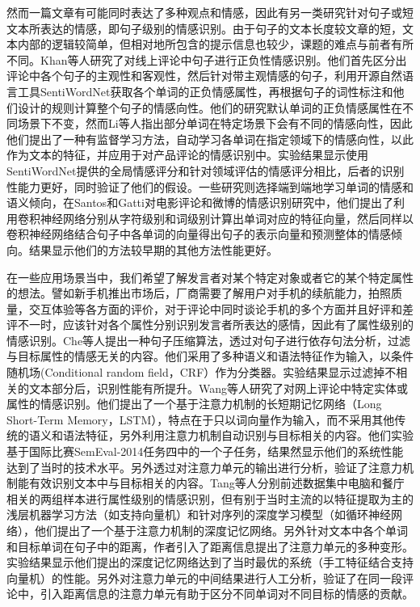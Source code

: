 然而一篇文章有可能同时表达了多种观点和情感，因此有另一类研究针对句子或短文本所表达的情感，即句子级别的情感识别。由于句子的文本长度较文章的短，文本内部的逻辑较简单，但相对地所包含的提示信息也较少，课题的难点与前者有所不同。Khan等人\cite{khan2011sentiment}研究了对线上评论中句子进行正负性情感识别。他们首先区分出评论中各个句子的主观性和客观性，然后针对带主观情感的句子，利用开源自然语言工具SentiWordNet获取各个单词的正负情感属性，再根据句子的词性标注和他们设计的规则计算整个句子的情感向性。他们的研究默认单词的正负情感属性在不同场景下不变，然而Li等人\cite{li2013constructing}指出部分单词在特定场景下会有不同的情感向性，因此他们提出了一种有监督学习方法，自动学习各单词在指定领域下的情感向性，以此作为文本的特征，并应用于对产品评论的情感识别中。实验结果显示使用SentiWordNet提供的全局情感评分和针对领域评估的情感评分相比，后者的识别性能力更好，同时验证了他们的假设。一些研究则选择端到端地学习单词的情感和语义倾向，在Santos和Gatti\cite{dos2014deep}对电影评论和微博的情感识别研究中，他们提出了利用卷积神经网络分别从字符级别和词级别计算出单词对应的特征向量，然后同样以卷积神经网络结合句子中各单词的向量得出句子的表示向量和预测整体的情感倾向。结果显示他们的方法较早期的其他方法性能更好。

在一些应用场景当中，我们希望了解发言者对某个特定对象或者它的某个特定属性的想法。譬如新手机推出市场后，厂商需要了解用户对手机的续航能力，拍照质量，交互体验等各方面的评价，对于评论中同时谈论手机的多个方面并且好评和差评不一时，应该针对各个属性分别识别发言者所表达的感情，因此有了属性级别的情感识别。Che等人\cite{che2015sentence}提出一种句子压缩算法，透过对句子进行依存句法分析，过滤与目标属性的情感无关的内容。他们采用了多种语义和语法特征作为输入，以条件随机场(Conditional random field，CRF）作为分类器。实验结果显示过滤掉不相关的文本部分后，识别性能有所提升。Wang等人\cite{wang2016attention}研究了对网上评论中特定实体或属性的情感识别。他们提出了一个基于注意力机制的长短期记忆网络（Long Short-Term Memory，LSTM），特点在于只以词向量作为输入，而不采用其他传统的语义和语法特征，另外利用注意力机制自动识别与目标相关的内容。他们实验基于国际比赛SemEval-2014任务四\cite{pontiki2014semeval}中的一个子任务，结果然显示他们的系统性能达到了当时的技术水平。另外透过对注意力单元的输出进行分析，验证了注意力机制能有效识别文本中与目标相关的内容。Tang等人\cite{tang2016aspect}分别前述数据集中电脑和餐庁相关的两组样本进行属性级别的情感识别，但有别于当时主流的以特征提取为主的浅层机器学习方法（如支持向量机）和针对序列的深度学习模型（如循环神经网络），他们提出了一个基于注意力机制的深度记忆网络。另外针对文本中各个单词和目标单词在句子中的距离，作者引入了距离信息提出了注意力单元的多种变形。实验结果显示他们提出的深度记忆网络达到了当时最优的系统（手工特征结合支持向量机）的性能。另外对注意力单元的中间结果进行人工分析，验证了在同一段评论中，引入距离信息的注意力单元有助于区分不同单词对不同目标的情感的贡献。

